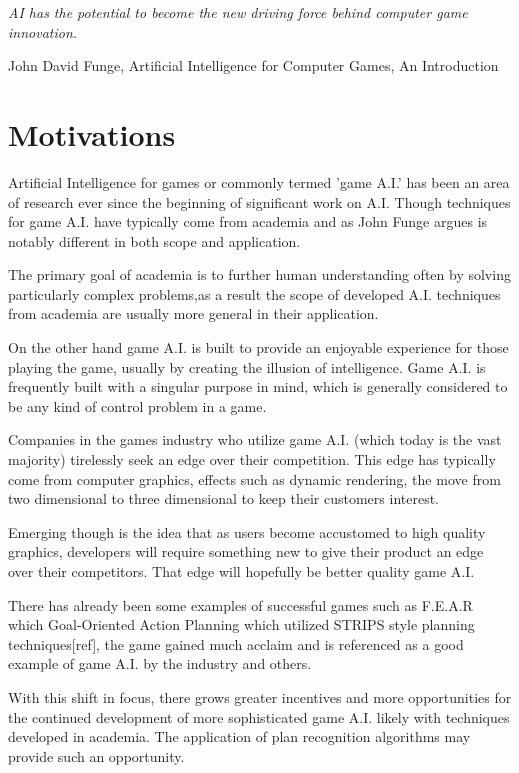 \documentclass[parskip]{cs4rep}
\begin{document}
\begin{flushleft}
\textit{AI has the potential to become the new driving force behind computer game innovation.}
\end{flushleft}
\begin{flushleft}
John David Funge, Artificial Intelligence for Computer Games, An Introduction
\end{flushleft}

\section{Motivations}

Artificial Intelligence for games or commonly termed 'game A.I.' has been an area of research ever since the beginning of significant work on A.I. Though techniques for game A.I. have typically come from academia and as John Funge argues \cite{JohnFunge:AIForComp} is notably different in both scope and application.

The primary goal of academia is to further human understanding often by solving particularly complex problems,as a result the scope of developed A.I. techniques from academia are usually more general in their application.

On the other hand game A.I. is built to provide an enjoyable experience for those playing the game, usually by creating the illusion of intelligence. Game A.I. is frequently built with a singular purpose in mind, which is generally considered to be any kind of control problem in a game.

Companies in the games industry who utilize game A.I. (which today is the vast majority) tirelessly seek an edge over their competition. This edge has typically come from computer graphics, effects such as dynamic rendering, the move from two dimensional to three dimensional to keep their customers interest. 

Emerging though is the idea that as users become accustomed to high quality graphics, developers will require something new to give their product an edge over their competitors. That edge will hopefully be better quality game A.I.

There has already been some examples of successful games such as F.E.A.R which Goal-Oriented Action Planning which utilized STRIPS style planning techniques[ref], the game gained much acclaim and is referenced as a good example of game A.I. by the industry and others.

With this shift in focus, there grows greater incentives and more opportunities for the continued development of more sophisticated game A.I. likely with techniques developed in academia. The application of plan recognition algorithms may provide such an opportunity. 
\end{document}
